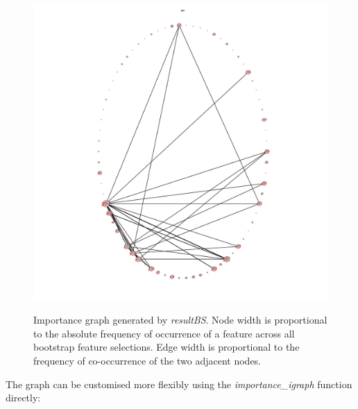 \documentclass[11pt,a4paper]{article}
\begin{document}
\begin{figure}[htp]
\centering
\includegraphics[width=12cm,height=12cm]{impgraph1}
\caption{Importance graph generated by \emph{resultBS}. Node width is proportional to the absolute frequency of occurrence of a feature across all bootstrap feature selections. Edge width is proportional to the frequency of co-occurrence of the two adjacent nodes.}
\label{fig:impgraph1}
\end{figure}

The graph can be customised more flexibly using the \emph{importance\_igraph} function directly:

\begin{Schunk}
\end{Schunk}

\end{document}
